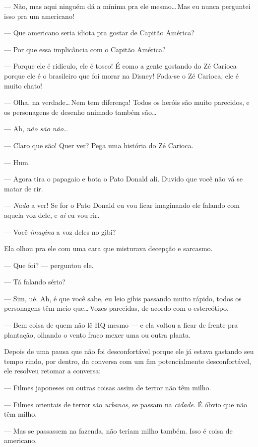 \begin{sloppypar}
--- Não, mas aqui ninguém dá a mínima pra ele mesmo\ldots\,Mas eu nunca perguntei isso pra um americano!
\end{sloppypar}

--- Que americano seria idiota pra gostar de Capitão América?

--- Por que essa implicância com o Capitão América?

--- Porque ele é ridículo, ele é tosco! É como a gente gostando do Zé Carioca porque ele é o brasileiro que foi morar na Disney! Foda-se o Zé Carioca, ele é muito chato!

--- Olha, na verdade\ldots\,Nem tem diferença! Todos os heróis são muito parecidos, e os personagens de desenho animado também são\ldots

--- Ah, \emph{não são não}\ldots

--- Claro que são! Quer ver? Pega uma história do Zé Carioca.

--- Hum.

--- Agora tira o papagaio e bota o Pato Donald ali. Duvido que você não vá se matar de rir.

--- \emph{Nada} a ver! Se for o Pato Donald eu vou ficar imaginando ele falando com aquela voz dele, e \emph{aí} eu vou rir.

--- Você \emph{imagina} a voz deles no gibi?

Ela olhou pra ele com uma cara que misturava decepção e sarcasmo.

--- Que foi? --- perguntou ele.

--- Tá falando sério?

--- Sim, ué. Ah, é que você sabe, eu leio gibis passando muito rápido, todos os personagens têm meio que\ldots\,Vozes parecidas, de acordo com o estereótipo.

--- Bem coisa de quem não lê HQ mesmo --- e ela voltou a ficar de frente pra plantação, olhando o vento fraco mexer uma ou outra planta.

Depois de uma pausa que não foi desconfortável porque ele já estava gastando seu tempo rindo, por dentro, da conversa com um fim potencialmente desconfortável, ele resolveu retomar a conversa:

--- Filmes japoneses ou outras coisas assim de terror não têm milho.

--- Filmes orientais de terror são \emph{urbanos}, se passam na \emph{cidade}. É óbvio que não têm milho.

--- Mas se passassem na fazenda, não teriam milho também. Isso é coisa de americano.

